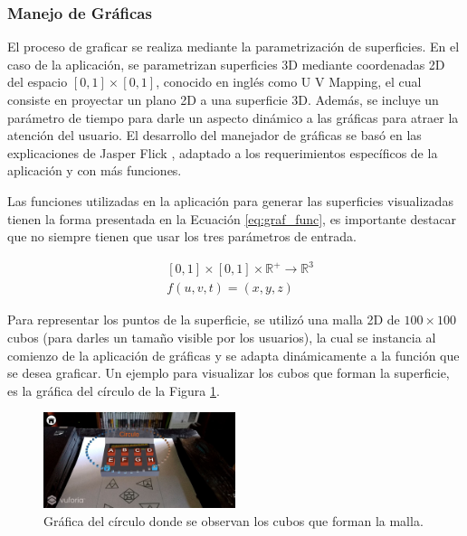 \subsubsection{Manejo de Gráficas} 
El proceso de graficar se realiza mediante la parametrización de superficies. En el caso de la aplicación, se parametrizan superficies 3D mediante coordenadas 2D del espacio $[0,1]\times[0,1]$, conocido en inglés como U V Mapping, el cual consiste en proyectar un plano 2D a una superficie 3D. Además, se incluye un parámetro de tiempo para darle un aspecto dinámico a las gráficas para atraer la atención del usuario. El desarrollo del manejador de gráficas se basó en las explicaciones de Jasper Flick \cite{flick2017}, adaptado a los requerimientos específicos de la aplicación y con más funciones.

Las funciones utilizadas en la aplicación para generar las superficies visualizadas tienen la forma presentada en la Ecuación \ref{eq:graf_func}, es importante destacar que no siempre tienen que usar los tres parámetros de entrada.

\begin{equation}\label{eq:graf_func}
\begin{aligned}
    & [0,1]\times[0,1]\times\mathbb{R}^+ \rightarrow \mathbb{R}^3 \\
    & f(u,v,t) = (x,y,z)
\end{aligned}
\end{equation}

Para representar los puntos de la superficie, se utilizó una malla 2D de $100 \times 100$ cubos (para darles un tamaño visible por los usuarios), la cual se instancia al comienzo de la aplicación de gráficas y  se adapta dinámicamente a la función que se desea graficar. Un ejemplo para visualizar los cubos que forman la superficie, es la gráfica del círculo de la Figura \ref{fig:graf_malla}. 

\begin{figure}[hbt!]
\centering
\includegraphics[width=0.5\textwidth]{figuras/graficas/malla.png}
\caption{\label{fig:graf_malla}Gráfica del círculo donde se observan los cubos que forman la malla.}
\end{figure}

